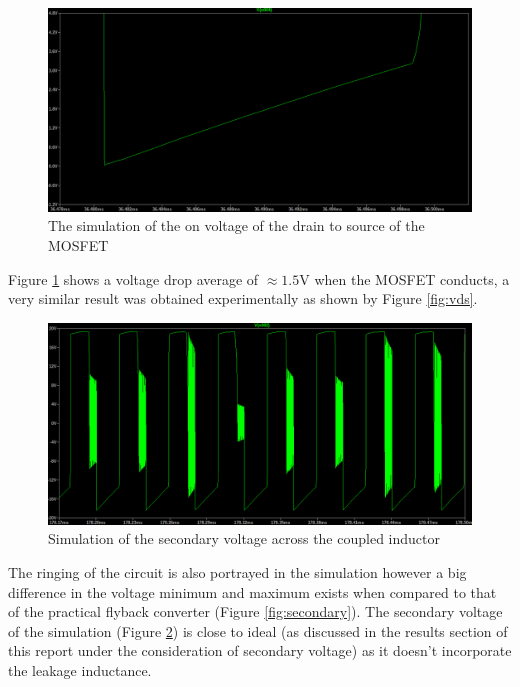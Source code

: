 \documentclass[a4paper, 12pt]{article}
\begin{document}
  \begin{figure}[H]
  \centering
  \includegraphics[width=\textwidth]{images/vds_on_sim.png}
  \caption{The simulation of the on voltage of the drain to source of the MOSFET}
  \label{fig:vds_on_sim}
\end{figure} 
Figure \ref{fig:vds_on_sim} shows a voltage drop average of $\approx 1.5$V when the MOSFET conducts, a very similar result was obtained experimentally as shown by Figure \ref{fig:vds}.

\begin{figure}[H]
  \centering
  \includegraphics[width=\textwidth]{images/secondary_sim.png}
  \caption{Simulation of the secondary voltage across the coupled inductor}
  \label{fig:secondary_sim}
\end{figure} 

The ringing of the circuit is also portrayed in the simulation however a big difference in the voltage minimum and maximum exists when compared to that of the practical flyback converter (Figure \ref{fig:secondary}). The secondary voltage of the simulation (Figure \ref{fig:secondary_sim}) is close to ideal (as discussed in the results section of this report under the consideration of secondary voltage) as it doesn't incorporate the leakage inductance.
\end{document}
